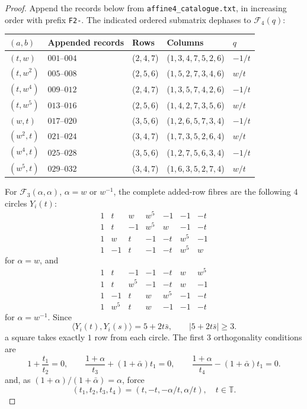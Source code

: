 \documentclass[11pt,a4paper]{article}
\theoremstyle{plain}
\theoremstyle{definition}
\numberwithin{equation}{section}
\begin{document}
\begin{proof}
\label{completion:witnesses}
Append the records below from \texttt{affine4\_catalogue.txt}, in increasing order with prefix \texttt{F2-}. The indicated ordered submatrix dephases to $\mathcal F_4(q)$:
\begin{center}\small \begin{tabular}{@{}lllll@{}}\toprule
$(a,b)$ & Appended records & Rows & Columns & $q$\\\midrule
$(t,w)$ &$001$--$004$&($2,4,7$)&($1,3,4,7,5,2,6$)&$-1/t$\\
$(t,w^2)$&$005$--$008$&($2,5,6$)&($1,5,2,7,3,4,6$)&$w/t$\\
$(t,w^4)$&$009$--$012$&($2,4,7$)&($1,3,5,7,4,2,6$)&$-1/t$\\
$(t,w^5)$&$013$--$016$&($2,5,6$)&($1,4,2,7,3,5,6$)&$w/t$\\
$(w,t)$ &$017$--$020$&($3,5,6$)&($1,2,6,5,7,3,4$)&$-1/t$\\
$(w^2,t)$&$021$--$024$&($3,4,7$)&($1,7,3,5,2,6,4$)&$w/t$\\
$(w^4,t)$&$025$--$028$&($3,5,6$)&($1,2,7,5,6,3,4$)&$-1/t$\\
$(w^5,t)$&$029$--$032$&($3,4,7$)&($1,6,3,5,2,7,4$)&$w/t$\\\bottomrule
\end{tabular}\end{center}
For $\mathcal F_3(\alpha,\alpha)$, $\alpha=w$ or $w^{-1}$, the complete added-row fibres are the following $4$ circles $Y_i(t)$:
$$
\begin{array}{rrrrrrr}
1&t&w&w^5&-1&-1&-t\\
1&t&-1&w^5&w&-1&-t\\
1&w&t&-1&-t&w^5&-1\\
1&-1&t&-1&-t&w^5&w
\end{array}
$$
for $\alpha=w$, and
$$
\begin{array}{rrrrrrr}
1&t&-1&-1&-t&w&w^5\\
1&t&w^5&-1&-t&w&-1\\
1&-1&t&w&w^5&-1&-t\\
1&w^5&t&w&-1&-1&-t
\end{array}
$$
for $\alpha=w^{-1}$. Since
$$
\langle Y_i(t),Y_i(s)\rangle=5+2t\bar{s},
\qquad |5+2t\bar{s}|\ge3.
$$
a square takes exactly $1$ row from each circle. The first $3$ orthogonality conditions are
$$
1+\frac{t_1}{t_2}=0,\qquad
\frac{1+\alpha}{t_3}+(1+\bar{\alpha})t_1=0,\qquad
\frac{1+\alpha}{t_4}-(1+\bar{\alpha})t_1=0.
$$
and, as $(1+\alpha)/(1+\bar{\alpha})=\alpha$, force
$$
\boxed{\ (t_1,t_2,t_3,t_4)=(t,-t,-\alpha/t,\alpha/t),\quad t\in\mathbb{T}.\ }
$$

\end{proof}
\end{document}
